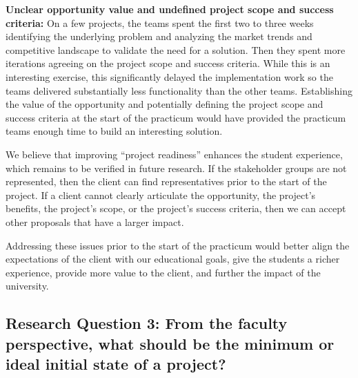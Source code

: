 \documentclass[conference]{IEEEtran}
\begin{document}
\textbf{Unclear opportunity value and undefined project scope and success
criteria:} On a few projects, the teams spent the first two to three
weeks identifying the underlying problem and
analyzing the market trends and competitive landscape to validate the
need for a solution. Then they spent more iterations agreeing on the
project scope and success criteria. While this is an interesting
exercise, this significantly delayed the implementation work so the teams delivered substantially less functionality than the other
teams. Establishing the value of the opportunity and potentially
defining the project scope and success criteria at the start of the
practicum would have provided the practicum teams enough time to
build an interesting solution.

We believe that improving ``project readiness'' enhances the student experience, which remains to be verified in future research. If the stakeholder groups are not represented, then the
client can find representatives prior to the start of the project. If a client cannot clearly articulate the opportunity, the project's
benefits, the project's scope, or the project's success criteria, then
we can accept other proposals that have a larger impact.

Addressing these issues prior to the start of the practicum would
better align the expectations of the client with our educational goals, give the students a richer experience, provide more value to the client, and further the impact of the university.

\subsection{Research Question 3: From the faculty perspective, what should be the minimum or ideal initial state of a project?}
\end{document}
